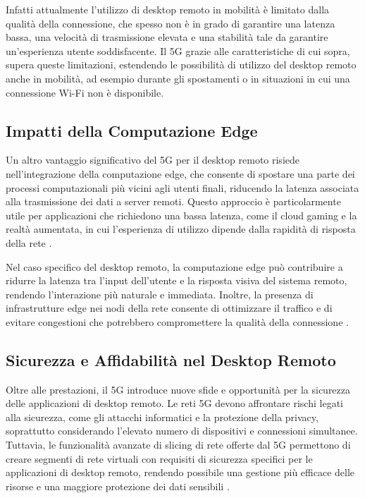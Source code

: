 \documentclass[12pt,a4paper,openright,twoside]{book}
\begin{document}
Infatti attualmente l'utilizzo di desktop remoto in mobilità è limitato dalla qualità della connessione, che spesso non è in grado di garantire una latenza bassa, una velocità di trasmissione elevata e una stabilità tale da garantire un'esperienza utente soddisfacente. Il 5G grazie alle caratteristiche di cui sopra, supera queste limitazioni, estendendo le possibilità di utilizzo del desktop remoto anche in mobilità, ad esempio durante gli spostamenti o in situazioni in cui una connessione Wi-Fi non è disponibile.

\subsection{Impatti della Computazione Edge}

Un altro vantaggio significativo del 5G per il desktop remoto risiede nell'integrazione della computazione edge, che consente di spostare una parte dei processi computazionali più vicini agli utenti finali, riducendo la latenza associata alla trasmissione dei dati a server remoti. Questo approccio è particolarmente utile per applicazioni che richiedono una bassa latenza, come il cloud gaming e la realtà aumentata, in cui l'esperienza di utilizzo dipende dalla rapidità di risposta della rete \cite{Sahu2024}.

Nel caso specifico del desktop remoto, la computazione edge può contribuire a ridurre la latenza tra l’input dell’utente e la risposta visiva del sistema remoto, rendendo l’interazione più naturale e immediata. Inoltre, la presenza di infrastrutture edge nei nodi della rete consente di ottimizzare il traffico e di evitare congestioni che potrebbero compromettere la qualità della connessione \cite{Dangi2021}.

\subsection{Sicurezza e Affidabilità nel Desktop Remoto}

Oltre alle prestazioni, il 5G introduce nuove sfide e opportunità per la sicurezza delle applicazioni di desktop remoto. Le reti 5G devono affrontare rischi legati alla sicurezza, come gli attacchi informatici e la protezione della privacy, soprattutto considerando l’elevato numero di dispositivi e connessioni simultanee. Tuttavia, le funzionalità avanzate di slicing di rete offerte dal 5G permettono di creare segmenti di rete virtuali con requisiti di sicurezza specifici per le applicazioni di desktop remoto, rendendo possibile una gestione più efficace delle risorse e una maggiore protezione dei dati sensibili \cite{Dangi2021}.
\end{document}
